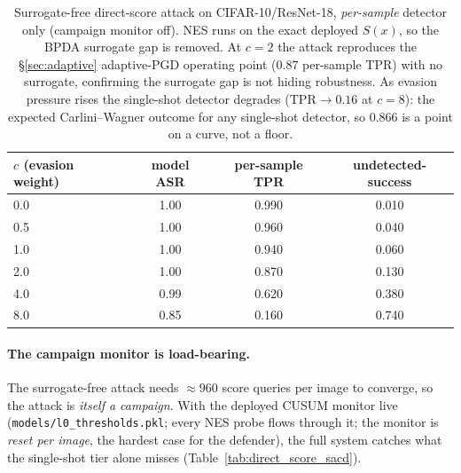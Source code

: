 \begin{table}[h]
\centering
\small
\begin{tabular}{lccc}
\toprule
$c$ (evasion weight) & model ASR & per-sample TPR & undetected-success \\
\midrule
0.0 & 1.00 & 0.990 & 0.010 \\
0.5 & 1.00 & 0.960 & 0.040 \\
1.0 & 1.00 & 0.940 & 0.060 \\
2.0 & 1.00 & 0.870 & 0.130 \\
4.0 & 0.99 & 0.620 & 0.380 \\
8.0 & 0.85 & 0.160 & 0.740 \\
\bottomrule
\end{tabular}
\caption{%
  Surrogate-free direct-score attack on CIFAR-10/ResNet-18, \emph{per-sample}
  detector only (campaign monitor off). NES runs on the exact deployed $S(x)$,
  so the BPDA surrogate gap is removed. At $c{=}2$ the attack reproduces the
  \S\ref{sec:adaptive} adaptive-PGD operating point
  ($0.87$ per-sample TPR) with no surrogate, confirming the surrogate gap is
  not hiding robustness. As evasion pressure rises the single-shot detector
  degrades ($\mathrm{TPR}{\to}0.16$ at $c{=}8$): the expected
  Carlini--Wagner outcome for any single-shot detector, so $0.866$ is a point
  on a curve, not a floor.
}
\label{tab:direct_score}
\end{table}

\paragraph{The campaign monitor is load-bearing.} The surrogate-free attack
needs ${\approx}960$ score queries per image to converge, so the attack is
\emph{itself a campaign}. With the deployed \sacd CUSUM monitor live
(\texttt{models/l0\_thresholds.pkl}; every NES probe flows through it; the
monitor is \emph{reset per image}, the hardest case for the defender), the
full system catches what the single-shot tier alone misses
(Table~\ref{tab:direct_score_sacd}).

